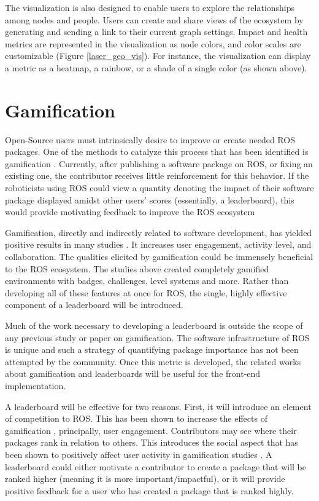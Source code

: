 \documentclass[letterpaper, 10 pt, conference]{ieeeconf}  %
\begin{document}
The visualization is also designed to enable users to explore the relationships among nodes and people. Users can create and share views of the ecosystem by generating and sending a link to their current graph settings. Impact and health metrics are represented in the visualization as node colors, and color scales are customizable (Figure \ref{laser_geo_vis}). For instance, the visualization can display a metric as a heatmap, a rainbow, or a shade of a single color (as shown above).

\section{Gamification}

Open-Source users must intrinsically desire to improve or create needed ROS packages. One of the methods to catalyze this process that has been identified is gamification \cite{hamari_gamification}. Currently, after publishing a software package on ROS, or fixing an existing one, the contributor receives little reinforcement for this behavior. If the roboticists using ROS could view a quantity denoting the impact of their software package displayed amidst other users' scores (essentially, a leaderboard), this would provide motivating feedback to improve the ROS ecosystem

Gamification, directly and indirectly related to software development, has yielded positive results in many studies \cite{Dubois:2013:UGM:2491411.2494589,Ahmed-Game,hamari_gamification,Li-Engaging}. It increases user engagement, activity level, and collaboration. The qualities elicited by gamification could be immensely beneficial to the ROS ecosystem. The studies above created completely gamified environments with badges, challenges, level systems and more. Rather than developing all of these features at once for ROS, the single, highly effective component of a leaderboard \cite{Ahmed-Game} will be introduced.

Much of the work necessary to developing a leaderboard is outside the scope of any previous study or paper on gamification. The software infrastructure of ROS is unique and such a strategy of quantifying package importance has not been attempted by the community. Once this metric is developed, the related works about gamification and leaderboards will be useful for the front-end implementation.

A leaderboard will be effective for two reasons. First, it will introduce an element of competition to ROS. This has been shown to increase the effects of gamification \cite{Dubois:2013:UGM:2491411.2494589}, principally, user engagement. Contributors may see where their packages rank in relation to others. This introduces the social aspect that has been shown to positively affect user activity in gamification studies \cite{Li-Engaging}. A leaderboard could either motivate a contributor to create a package that will be ranked higher (meaning it is more important/impactful), or it will provide positive feedback for a user who has created a package that is ranked highly.
\end{document}
